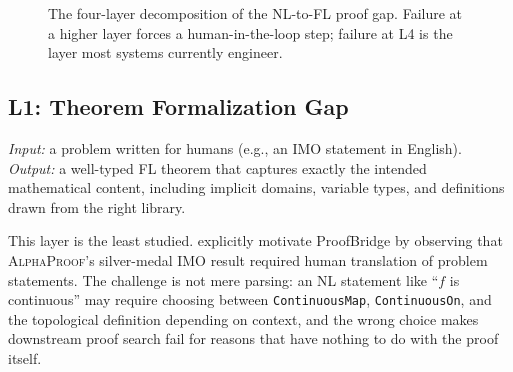 \documentclass[11pt,letterpaper]{article}
\begin{document}
\begin{figure}[t]
\centering
{}
\caption{The four-layer decomposition of the NL-to-FL proof gap.
Failure at a higher layer forces a human-in-the-loop step; failure at
L4 is the layer most systems currently engineer.}
\label{fig:pyramid}
\end{figure}

\subsection{L1: Theorem Formalization Gap}
\label{sec:l1}

\emph{Input:} a problem written for humans (e.g., an IMO statement in
English). \emph{Output:} a well-typed FL theorem that captures exactly
the intended mathematical content, including implicit domains,
variable types, and definitions drawn from the right library.

This layer is the least studied. \citet{jana2025proofbridge}
explicitly motivate ProofBridge by observing that \textsc{AlphaProof}'s
silver-medal IMO result required human translation of problem
statements. The challenge is not mere parsing: an NL statement like
``$f$ is continuous'' may require choosing between
\texttt{ContinuousMap}, \texttt{ContinuousOn}, and the topological
definition depending on context, and the wrong choice makes downstream
proof search fail for reasons that have nothing to do with the proof
itself.
\end{document}
